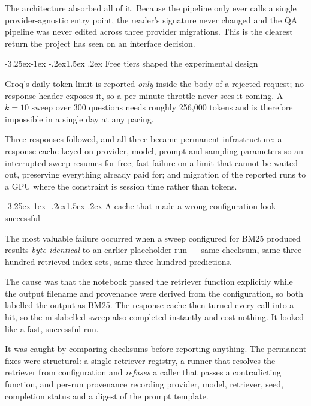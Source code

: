 \documentclass[11pt,a4paper]{article}
\makeatletter
\renewcommand\subsection{\@startsection{subsection}{2}{\z@}%
  {-3.25ex\@plus -1ex \@minus -.2ex}{1.5ex \@plus .2ex}%
  {\color{accent}\normalfont\large\bfseries}}
\makeatother
\begin{document}
The architecture absorbed all of it. Because the pipeline only ever calls a
single provider-agnostic entry point, the reader's signature never changed and
the QA pipeline was never edited across three provider migrations. This is the
clearest return the project has seen on an interface decision.

\subsection{Free tiers shaped the experimental design}

Groq's daily token limit is reported \emph{only} inside the body of a rejected
request; no response header exposes it, so a per-minute throttle never sees it
coming. A $k=10$ sweep over 300 questions needs roughly 256{,}000 tokens and is
therefore impossible in a single day at any pacing.

Three responses followed, and all three became permanent infrastructure: a
response cache keyed on provider, model, prompt and sampling parameters so an
interrupted sweep resumes for free; fast-failure on a limit that cannot be waited
out, preserving everything already paid for; and migration of the reported runs
to a GPU where the constraint is session time rather than tokens.

\subsection{A cache that made a wrong configuration look successful}

The most valuable failure occurred when a sweep configured for BM25 produced
results \emph{byte-identical} to an earlier placeholder run --- same checksum,
same three hundred retrieved index sets, same three hundred predictions.

The cause was that the notebook passed the retriever function explicitly while
the output filename and provenance were derived from the configuration, so both
labelled the output as BM25. The response cache then turned every call into a
hit, so the mislabelled sweep also completed instantly and cost nothing. It
looked like a fast, successful run.

It was caught by comparing checksums before reporting anything. The permanent
fixes were structural: a single retriever registry, a runner that resolves the
retriever from configuration and \emph{refuses} a caller that passes a
contradicting function, and per-run provenance recording provider, model,
retriever, seed, completion status and a digest of the prompt template.
\end{document}
